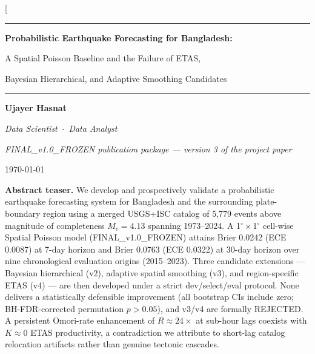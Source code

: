 \documentclass[10pt,a4paper,twocolumn]{article}
\begin{document}
\twocolumn[
\begin{@twocolumnfalse}
\centering
\vspace*{0.4em}
{\color{accent}\rule{\linewidth}{1.2pt}}\par\vspace{0.6em}
{\LARGE\bfseries\color{accent} Probabilistic Earthquake Forecasting for Bangladesh:\par\vspace{2pt}
A Spatial Poisson Baseline and the Failure of ETAS,\par
Bayesian Hierarchical, and Adaptive Smoothing Candidates\par}\vspace{0.6em}
{\color{accent}\rule{\linewidth}{0.6pt}}\par\vspace{1.0em}
{\large\bfseries Ujayer Hasnat}\par\vspace{0.3em}
{\small\itshape Data Scientist \,$\cdot$\, Data Analyst}\par\vspace{0.4em}
{\small\itshape FINAL\_v1.0\_FROZEN publication package --- version 3 of the project paper}\par\vspace{0.3em}
{\small\today}\par\vspace{0.8em}
\begin{minipage}{0.86\linewidth}
\small\textbf{Abstract teaser.} We develop and prospectively validate a probabilistic earthquake forecasting system for Bangladesh and the surrounding plate-boundary region using a merged USGS+ISC catalog of 5{,}779 events above magnitude of completeness $M_c=4.13$ spanning 1973--2024. A 1$^\circ\times$1$^\circ$ cell-wise Spatial Poisson model (FINAL\_v1.0\_FROZEN) attains Brier 0.0242 (ECE 0.0087) at 7-day horizon and Brier 0.0763 (ECE 0.0322) at 30-day horizon over nine chronological evaluation origins (2015--2023). Three candidate extensions --- Bayesian hierarchical (v2), adaptive spatial smoothing (v3), and region-specific ETAS (v4) --- are then developed under a strict dev/select/eval protocol. None delivers a statistically defensible improvement (all bootstrap CIs include zero; BH-FDR-corrected permutation $p>0.05$), and v3/v4 are formally REJECTED. A persistent Omori-rate enhancement of $R\approx24\times$ at sub-hour lags coexists with $K\approx0$ ETAS productivity, a contradiction we attribute to short-lag catalog relocation artifacts rather than genuine tectonic cascades.

\end{minipage}
\end{@twocolumnfalse}
\end{document}
